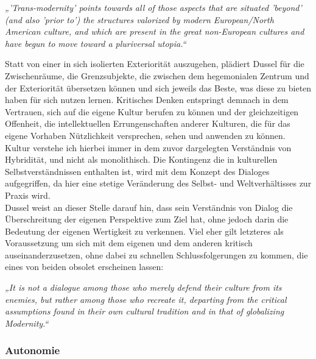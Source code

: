\begin{myenv} \textit{„'Trans-modernity' points towards all of those aspects
    that are situated 'beyond' (and also 'prior to') the structures valorized by
    modern European/North American culture, and which are present in the great
    non-European cultures and have begun to move toward a pluriversal
utopia.“\footnotemark {}} \end{myenv}
Statt von einer in sich isolierten Exteriorität auszugehen, plädiert Dussel für
die Zwischenräume, die Grenzsubjekte, die zwischen dem hegemonialen Zentrum und
der Exteriorität übersetzen können und sich jeweils das Beste, was diese zu
bieten haben für sich nutzen lernen. Kritisches Denken entspringt demnach in dem
Vertrauen, sich auf die eigene Kultur berufen zu können und der gleichzeitigen
Offenheit, die intellektuellen Errungenschaften anderer Kulturen, die für das
eigene Vorhaben Nützlichkeit versprechen, sehen und anwenden zu
können.\footnotemark {}\\
 Kultur verstehe ich hierbei immer
in dem zuvor dargelegten Verständnis von Hybridität, und nicht als monolithisch.
Die Kontingenz die in kulturellen Selbstverständnissen enthalten ist, wird mit
dem Konzept des Dialoges aufgegriffen, da hier eine stetige Veränderung des
Selbst- und Weltverhältisses zur Praxis wird.\\

\noindent Dussel weist an dieser Stelle darauf hin, dass sein Verständnis von Dialog die
Überschreitung der eigenen Perspektive zum Ziel hat, ohne jedoch darin die
Bedeutung der eigenen Wertigkeit zu verkennen. Viel eher gilt letzteres als
Voraussetzung um sich mit dem eigenen und dem anderen kritisch
auseinanderzusetzen, ohne dabei zu schnellen Schlussfolgerungen zu kommen, die
eines von beiden obsolet erscheinen lassen:
\begin{myenv}
    \textit{„It is not a dialogue among those who merely defend their culture
    from its enemies, but rather among those who recreate it, departing from the
    critical assumptions found in their own cultural tradition and in that of
    globalizing Modernity.“\footnotemark {}}
\end{myenv}

\subsubsection{Autonomie}

